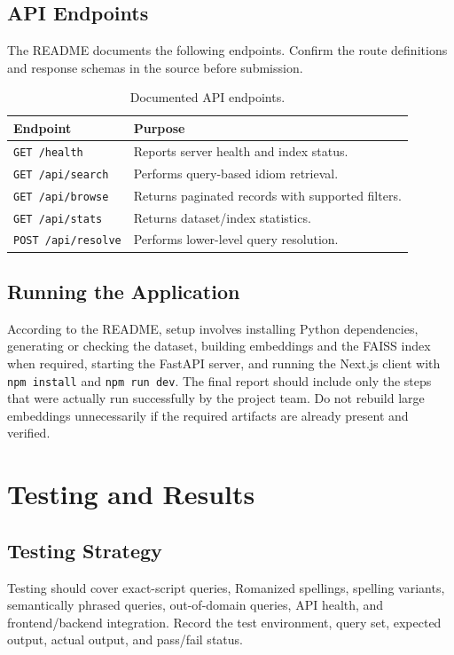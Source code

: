 \documentclass[12pt,a4paper]{report}
\begin{document}
\section{API Endpoints}
The README documents the following endpoints. Confirm the route definitions and
response schemas in the source before submission.

\begin{table}[ht]
    \centering
    \begin{tabularx}{0.85\textwidth}{lX}
        \toprule
        \textbf{Endpoint} & \textbf{Purpose}\\
        \midrule
        \texttt{GET /health} & Reports server health and index status.\\
        \texttt{GET /api/search} & Performs query-based idiom retrieval.\\
        \texttt{GET /api/browse} & Returns paginated records with supported filters.\\
        \texttt{GET /api/stats} & Returns dataset/index statistics.\\
        \texttt{POST /api/resolve} & Performs lower-level query resolution.\\
        \bottomrule
    \end{tabularx}
    \caption{Documented API endpoints.}
    \label{tab:endpoints}
\end{table}

\section{Running the Application}
According to the README, setup involves installing Python dependencies, generating
or checking the dataset, building embeddings and the FAISS index when required,
starting the FastAPI server, and running the Next.js client with \texttt{npm
install} and \texttt{npm run dev}. The final report should include only the steps
that were actually run successfully by the project team. Do not rebuild large
embeddings unnecessarily if the required artifacts are already present and
verified.

\chapter{Testing and Results}

\section{Testing Strategy}
Testing should cover exact-script queries, Romanized spellings, spelling variants,
semantically phrased queries, out-of-domain queries, API health, and
frontend/backend integration. Record the test environment, query set, expected
output, actual output, and pass/fail status.
\end{document}
